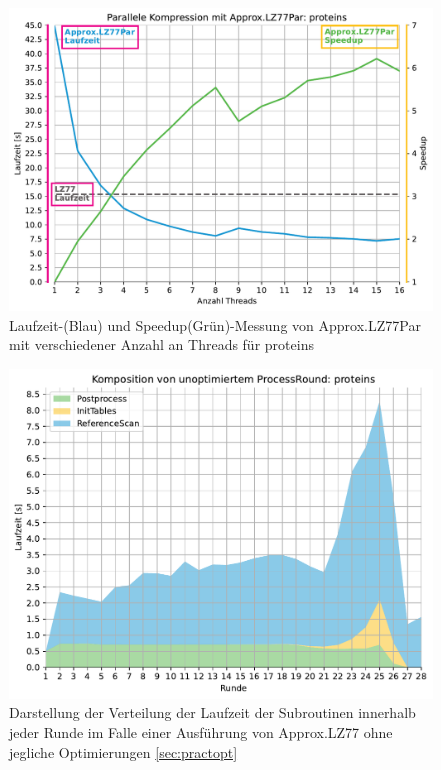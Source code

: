 \begin{figure}[ht]
    \centering
    \includegraphics[scale=0.65]{Images/progressive_speedup_proteins.pdf}
    \caption{Laufzeit-(Blau) und Speedup(Grün)-Messung von Approx.LZ77Par mit verschiedener Anzahl an Threads für proteins}
    \label{runtime_threads}
\end{figure}

\begin{figure}[H]
    \centering
    \includegraphics[scale=0.7]{Images/progressive_unopt_stack.pdf}
    \caption{Darstellung der Verteilung der Laufzeit der Subroutinen innerhalb jeder Runde im Falle einer Ausführung von Approx.LZ77 ohne jegliche Optimierungen \ref{sec:practopt}}
    \label{unopt}
\end{figure}

